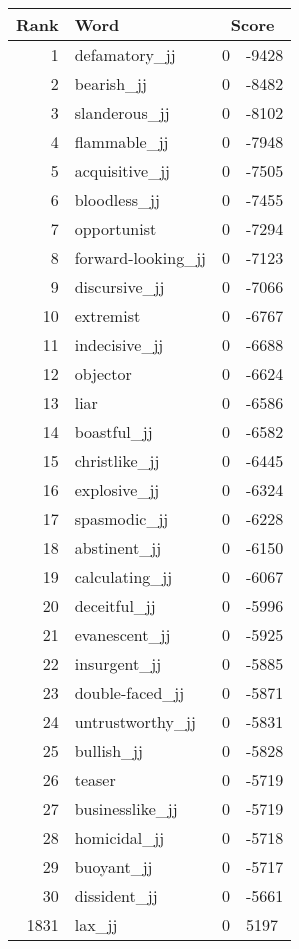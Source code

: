 \begin{longtable}[!htbp]{| rlr@{.}l |}
    \hline
    \textbf{Rank} & \textbf{Word} & \multicolumn{2}{c|}{\textbf{Score}} \\
    \hline
    \endhead
    1 & defamatory\_jj & 0 & -9428 \\
    2 & bearish\_jj & 0 & -8482 \\
    3 & slanderous\_jj & 0 & -8102 \\
    4 & flammable\_jj & 0 & -7948 \\
    5 & acquisitive\_jj & 0 & -7505 \\
    6 & bloodless\_jj & 0 & -7455 \\
    7 & opportunist & 0 & -7294 \\
    8 & forward-looking\_jj & 0 & -7123 \\
    9 & discursive\_jj & 0 & -7066 \\
    10 & extremist & 0 & -6767 \\
    11 & indecisive\_jj & 0 & -6688 \\
    12 & objector & 0 & -6624 \\
    13 & liar & 0 & -6586 \\
    14 & boastful\_jj & 0 & -6582 \\
    15 & christlike\_jj & 0 & -6445 \\
    16 & explosive\_jj & 0 & -6324 \\
    17 & spasmodic\_jj & 0 & -6228 \\
    18 & abstinent\_jj & 0 & -6150 \\
    19 & calculating\_jj & 0 & -6067 \\
    20 & deceitful\_jj & 0 & -5996 \\
    21 & evanescent\_jj & 0 & -5925 \\
    22 & insurgent\_jj & 0 & -5885 \\
    23 & double-faced\_jj & 0 & -5871 \\
    24 & untrustworthy\_jj & 0 & -5831 \\
    25 & bullish\_jj & 0 & -5828 \\
    26 & teaser & 0 & -5719 \\
    27 & businesslike\_jj & 0 & -5719 \\
    28 & homicidal\_jj & 0 & -5718 \\
    29 & buoyant\_jj & 0 & -5717 \\
    30 & dissident\_jj & 0 & -5661 \\
    1831 & lax\_jj & 0 & 5197 \\

\end{longtable}
